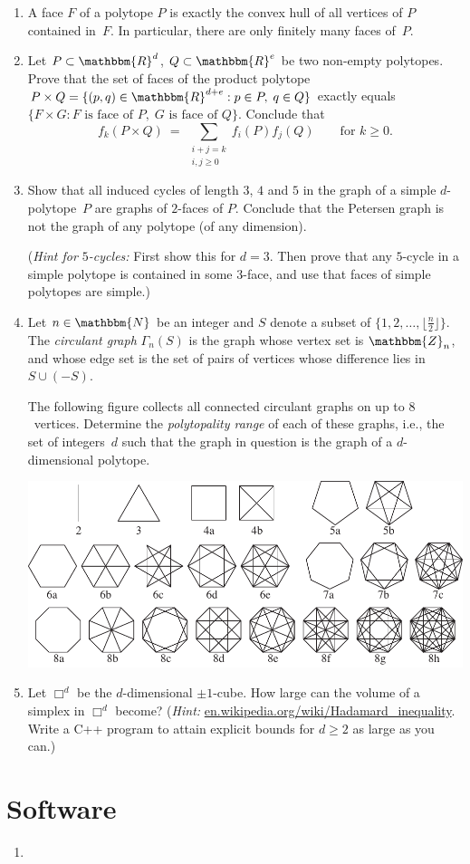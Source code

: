 \documentclass[11pt]{amsart}
\newcommand{\N}{\mathbbm{N}}
\newcommand{\R}{\mathbbm{R}}
\newcommand{\Z}{\mathbbm{Z}}
\begin{document}
\begin{enumerate}

\item A face $F$ of a polytope $P$ is exactly the convex hull of all   vertices of $P$ contained in~$F$. 
In particular, there are only   finitely many faces of~$P$.

\item Let $P\subset\R^d$, $Q\subset\R^e$ be two non-empty polytopes. Prove that the set of faces of the product polytope $P\times Q=\{(p,q)\in\R^{d+e}:p\in P,\; q\in Q\}$ exactly equals $\{F\times G: F\text{ is face of }P, \;G\text{ is face of }Q\}$. Conclude that
\[
    f_k(P\times Q)
    \ = \
    \sum_{\substack{i+j=k\\i,j\ge0}}f_i(P) f_j(Q)
    \qquad
    \text{for } k\ge0.
\]

\item Show that all induced cycles of length $3$, $4$ and $5$ in the graph of a simple $d$-polytope~$P$ are graphs of $2$-faces of $P$.
Conclude that the Petersen graph is not the graph of any polytope (of any dimension).

(\emph{Hint for $5$-cycles:} First show this for $d=3$. Then prove
that any $5$-cycle in a simple polytope is contained in some $3$-face,
and use that faces of  simple polytopes are simple.)

\item Let $n\in\N$ be an integer and $S$ denote a subset of
  $\{1,2,\dots,\lfloor\frac{n}{2}\rfloor\}$.  
  The \emph{circulant graph} $\Gamma_n(S)$ is the graph whose vertex set is $\Z_n$, and whose edge set is the set of pairs of vertices whose difference lies in $S\cup (-S)$. 

The following figure collects all connected circulant graphs on up to $8$~vertices. Determine the \emph{polytopality range} of each of these graphs, i.e., the set of integers~$d$ such that the graph in question is the graph of a $d$-dimensional polytope.

\bigskip
\includegraphics[width=\linewidth]{circulant}

\item Let $\Box^d$ be the $d$-dimensional $\pm1$-cube. How large can the volume of a simplex in $\Box^d$ become? (\emph{Hint:} \url{en.wikipedia.org/wiki/Hadamard_inequality}. Write a  C++ program to attain explicit bounds for $d\ge2$ as large as you can.)
\end{enumerate}

\bigskip
\bigskip
\section*{Software}

\begin{enumerate}
\setlength{\itemsep}{2ex}
\item
\end{enumerate}
\end{document}
